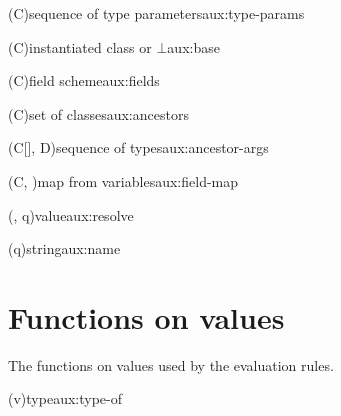 \begin{auxfunction}{\typeParams{\Sigma}(C)}{sequence of type parameters}{aux:type-params}

\end{auxfunction}

\begin{auxfunction}{\base{\Sigma}(C)}{instantiated class or $\bot$}{aux:base}

\end{auxfunction}

\begin{auxfunction}{\fields{\Sigma}(C)}{field scheme}{aux:fields}

\end{auxfunction}

\begin{auxfunction}{\ancestors{\Sigma}(C)}{set of classes}{aux:ancestors}

\end{auxfunction}

\begin{auxfunction}{\ancestorArgs{\Sigma}(C[\seq{\tau}], D)}{sequence of types}{aux:ancestor-args}

\end{auxfunction}

\begin{auxfunction}{\fieldMap{\Sigma}(C, )}{map from variables}{aux:field-map}

\end{auxfunction}

\begin{auxfunction}{\resolve(\rho, q)}{value}{aux:resolve}

\end{auxfunction}

\begin{auxfunction}{\nameOf(q)}{string}{aux:name}

\end{auxfunction}

\section{Functions on values}
\label{sec:auxiliary-values}

The functions on values used by the evaluation rules.


\begin{auxfunction}{\typeOf(v)}{type}{aux:type-of}

\end{auxfunction}

